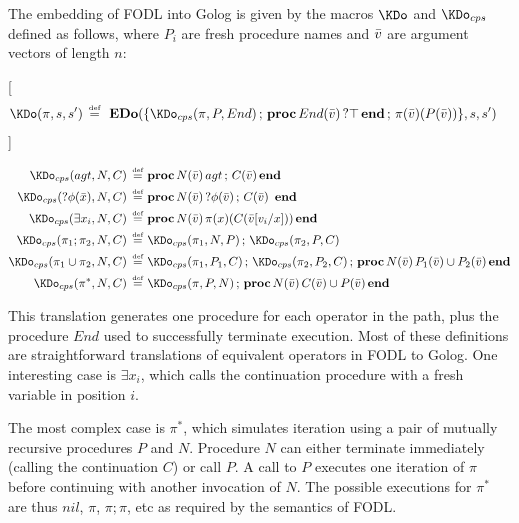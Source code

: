 \begin{defnL}
 The embedding of FODL into Golog
is given by the macros $\KDo$ and $\KDo_{cps}$ defined as follows,
where $P_{i}$ are fresh procedure names and $\bar{v}$ are argument
vectors of length $n$:

[{\begin{align*}
\KDo(\pi,s,s')\,\isdef\,\,\  & \EDo(\{\KDo_{cps}(\pi,P,End)\,;\,\mathbf{proc}\, End(\vars{v})\,?\top\,\mathbf{end}\,;\,\pi(\vars{v})(P(\vars{v}))\},s,s')\end{align*}
}]~
\end{defnL}
\begin{align*}
\KDo_{cps}(agt,N,C)\,\isdef\,\, & \mathbf{proc}\, N(\vars{v})\, agt\,;\, C(\vars{v})\,\mathbf{end}\\
\KDo_{cps}(?\phi(\vars{x}),N,C)\,\isdef\,\, & \mathbf{proc}\, N(\vars{v})\,?\phi(\vars{v})\,;\, C(\vars{v})\,\ \mathbf{end}\\
\KDo_{cps}(\exists x_{i},N,C)\,\isdef\,\, & \mathbf{proc}\, N(\vars{v})\,\pi(x)(C(\vars{v}[v_{i}/x]))\,\mathbf{end}\\
\KDo_{cps}(\pi_{1};\pi_{2},N,C)\,\isdef\,\, & \KDo_{cps}(\pi_{1},N,P)\,;\,\KDo_{cps}(\pi_{2},P,C)\\
\KDo_{cps}(\pi_{1}\cup\pi_{2},N,C)\,\isdef\,\, & \KDo_{cps}(\pi_{1},P_{1},C)\,;\,\KDo_{cps}(\pi_{2},P_{2},C)\,;\,\mathbf{proc}\, N(\vars{v})\, P_{1}(\vars{v})\cup P_{2}(\vars{v})\,\mathbf{end}\\
\KDo_{cps}(\pi^{*},N,C)\,\isdef\,\, & \KDo_{cps}(\pi,P,N)\,;\,\mathbf{proc}\, N(\vars{v})\, C(\vars{v})\cup P(\vars{v})\,\mathbf{end}\end{align*}


This translation generates one procedure for each operator in the
path, plus the procedure $End$ used to successfully terminate execution.
Most of these definitions are straightforward translations of equivalent
operators in FODL to Golog. One interesting case is $\exists x_{i}$,
which calls the continuation procedure with a fresh variable in position
$i$.

The most complex case is $\pi^{*}$, which simulates iteration using
a pair of mutually recursive procedures $P$ and $N$. Procedure $N$
can either terminate immediately (calling the continuation $C$) or
call $P$. A call to $P$ executes one iteration of $\pi$ before
continuing with another invocation of $N$. The possible executions
for $\pi^{*}$ are thus $nil$, $\pi$, $\pi;\pi$, etc as required
by the semantics of FODL.


